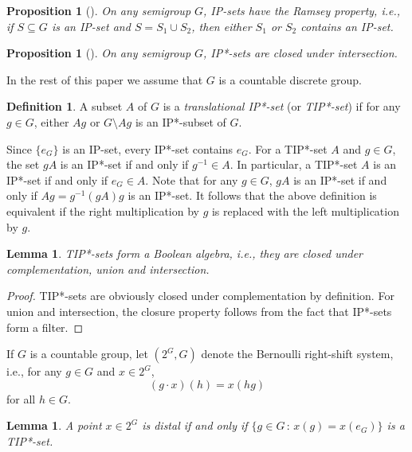 \documentclass[11pt]{amsart}
\newtheorem{proposition}[theorem]{Proposition}
\newtheorem{lemma}[theorem]{Lemma}
\theoremstyle{definition}
\newtheorem{definition}[theorem]{Definition}
\numberwithin{equation}{section}
\theoremstyle{definition}
\begin{document}
\begin{proposition}[{\cite[Proposition 8.13]{Fur}}]\label{Ramsey} On any semigroup $G$, IP-sets have the Ramsey property, i.e., if $S\subseteq G$ is an IP-set and $S=S_1\cup S_2$, then either $S_1$ or $S_2$ contains an IP-set.
\end{proposition}


\begin{proposition}[{\cite[Lemma 9.5]{Fur}}] On any semigroup $G$, IP*-sets are closed under intersection.
\end{proposition}



In the rest of this paper we assume that $G$ is a countable discrete group.

\begin{definition} A subset $A$ of $G$ is a {\em translational IP*-set} (or {\em TIP*-set}) if for any $g\in G$, either $Ag$ or $G\setminus Ag$ is an IP*-subset of $G$.
\end{definition}

Since $\{e_G\}$ is an IP-set, every IP*-set contains $e_G$. For a TIP*-set $A$ and $g\in G$, the set $gA$ is an IP*-set if and only if $g^{-1}\in A$. In particular, a TIP*-set $A$ is an IP*-set if and only if $e_G\in A$. Note that for any $g\in G$, $gA$ is an IP*-set if and only if $Ag=g^{-1}(gA)g$ is an IP*-set. It follows that the above definition is equivalent if the right multiplication by $g$ is replaced with the left multiplication by $g$. 

\begin{lemma} TIP*-sets form a Boolean algebra, i.e., they are closed under complementation, union and intersection.
\end{lemma}

\begin{proof} TIP*-sets are obviously closed under complementation by definition. For union and intersection, the closure property follows from the fact that IP*-sets form a filter.
\end{proof}

If $G$ is a countable group, let $(2^G, G)$ denote the Bernoulli right-shift system, i.e., for any $g\in G$ and $x\in 2^G$,
$$ (g\cdot x)(h)=x(hg) $$
for all $h\in G$.

\begin{lemma}\label{lem:sIP*} A point $x\in 2^G$ is distal if and only if $\{g\in G\,:\, x(g)=x(e_G)\}$ is a TIP*-set.
\end{lemma}
\end{document}

